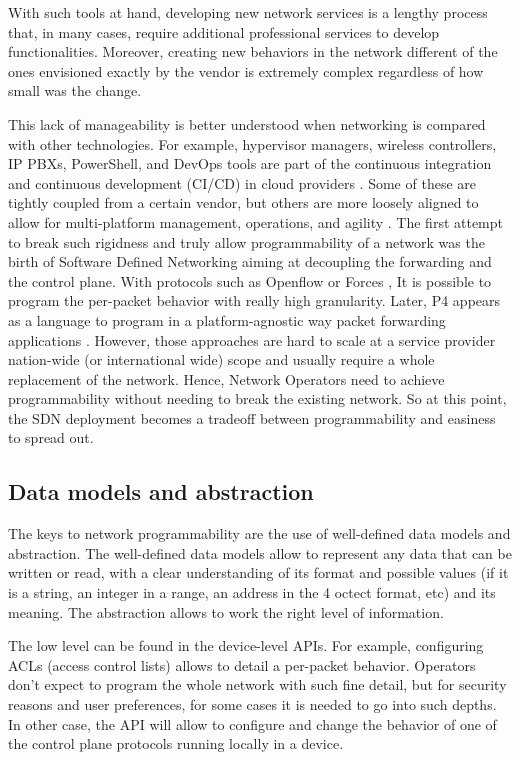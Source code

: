 \documentclass[a4paper,fleqn]{cas-dc}
\begin{document}
With such tools at hand, developing new network services is a lengthy process that, in many cases, require additional professional services to develop functionalities. Moreover, creating new behaviors in the network different of the ones envisioned exactly by the vendor is extremely complex regardless of how small was the change.

This lack of manageability is better understood when networking is compared with other technologies. For example, hypervisor managers, wireless controllers, IP PBXs, PowerShell, and DevOps tools are part of the continuous integration and continuous development (CI/CD) in cloud providers \cite{mittal2017cloud,demchenko2016zerotouch}. Some of these are tightly coupled from a certain vendor, but others are more loosely aligned to allow for multi-platform management, operations, and agility \cite{edelman2018network}.
The first attempt to break such rigidness and truly allow programmability of a network was the birth of Software Defined Networking aiming at decoupling the forwarding and the control plane. With protocols such as Openflow \cite{mckeown2008openflow} or Forces \cite{doria2010forwarding}, It is possible to program the per-packet behavior with really high granularity. Later, P4 appears as a language to program in a platform-agnostic way packet forwarding applications \cite{bosshart2014p4}. However, those approaches are hard to scale at a service provider nation-wide (or international wide) scope and usually require a whole replacement of the network. Hence, Network Operators need to achieve programmability without needing to break the existing network. So at this point, the SDN deployment becomes a tradeoff between programmability and easiness to spread out. 

\subsection{Data models and abstraction}

The keys to network programmability are the use of well-defined data models and abstraction. The well-defined data models allow to represent any data that can be written or read, with a clear understanding of its format and possible values (if it is a string, an integer in a range, an address in the 4 octect format, etc) and its meaning.  The abstraction allows to work the right level of information. 

The low level can be found in the device-level APIs. For example, configuring ACLs (access control lists) allows to detail a per-packet behavior. Operators don’t expect to program the whole network with such fine detail, but for security reasons and user preferences, for some cases it is needed to go into such depths. In other case, the API will allow to configure and change the behavior of one of the control plane protocols running locally in a device.
\end{document}
